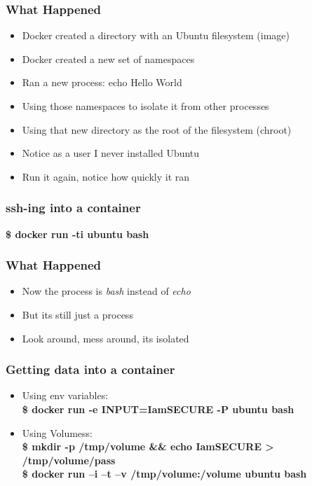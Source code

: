 \documentclass[aspectratio=169,11pt,hyperref={colorlinks=true}]{beamer}
\begin{document}
\begin{frame}
    \frametitle{What Happened}
    \begin{itemize}
        \item Docker created a directory with an Ubuntu filesystem (image)
        \item Docker created a new set of namespaces
        \item Ran a new process: echo Hello World
        \item Using those namespaces to isolate it from other processes
        \item Using that new directory as the root of the filesystem (chroot)
        \item Notice as a user I never installed Ubuntu
        \item Run it again, notice how quickly it ran
    \end{itemize}
\end{frame}

\begin{frame}
    \frametitle{ssh-ing into a container}
    \textbf{\$ docker run -ti ubuntu bash}
\end{frame}

\begin{frame}
    \frametitle{What Happened}
    \begin{itemize}
        \item Now the process is \textit{bash} instead of \textit{echo}
        \item But its still just a process
        \item Look around, mess around, its isolated
    \end{itemize}
\end{frame}

\begin{frame}
    \frametitle{Getting data into a container}
    \begin{itemize}
        \item Using env variables: \\
           \textbf{\$ docker run -e INPUT=IamSECURE -P ubuntu bash}
       \item Using Volumess: \\
           \textbf{\$ mkdir -p /tmp/volume \&\& echo IamSECURE > /tmp/volume/pass}\\
           \textbf{\$ docker run –i –t –v /tmp/volume:/volume ubuntu bash}
    \end{itemize}
\end{frame}
\end{document}
